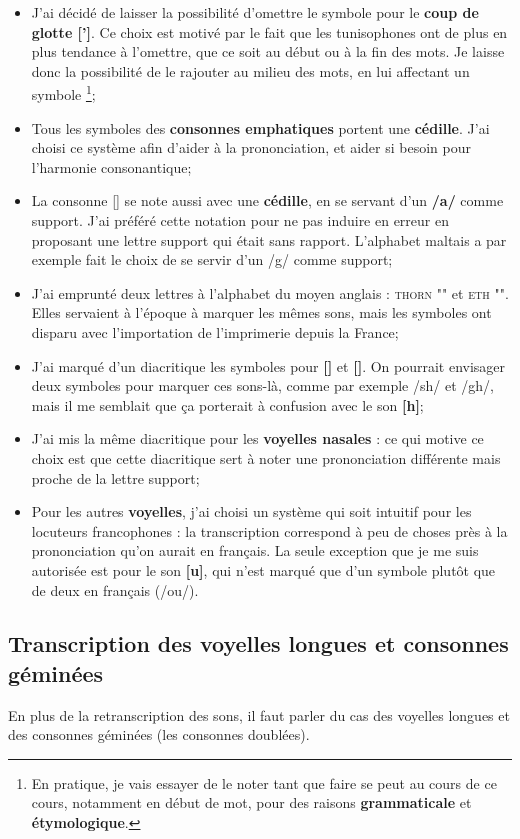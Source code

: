 \begin{itemize}
    \item J'ai décidé de laisser la possibilité d'omettre le symbole pour le \textbf{coup de glotte [']}. Ce choix est motivé par le fait que les tunisophones ont de plus en plus tendance à l'omettre, que ce soit au début ou à la fin des mots. Je laisse donc la possibilité de le rajouter au milieu des mots, en lui affectant un symbole \footnote{En pratique, je vais essayer de le noter tant que faire se peut au cours de ce cours, notamment en début de mot, pour des raisons \textbf{grammaticale} et \textbf{étymologique}.};
    \item Tous les symboles des \textbf{consonnes emphatiques} portent une \textbf{cédille}. J'ai choisi ce système afin d'aider à la prononciation, et aider si besoin pour l'harmonie consonantique;
    \item La consonne [\textrevglotstop] se note aussi avec une \textbf{cédille}, en se servant d'un \textbf{/a/} comme support. J'ai préféré cette notation pour ne pas induire en erreur en proposant une lettre support qui était sans rapport. L'alphabet maltais a par exemple fait le choix de se servir d'un /g/ comme support;
    \item J'ai emprunté deux lettres à l'alphabet du moyen anglais : \textsc{thorn} "\textbf{\th}" et \textsc{eth} "\textbf{\dh}". Elles servaient à l'époque à marquer les mêmes sons, mais les symboles ont disparu avec l'importation de l'imprimerie depuis la France;
    \item J'ai marqué d'un diacritique les symboles pour \textbf{[\textesh]} et \textbf{[\textinvscr]}. On pourrait envisager deux symboles pour marquer ces sons-là, comme par exemple /sh/ et /gh/, mais il me semblait que ça porterait à confusion avec le son \textbf{[h]};
    \item J'ai mis la même diacritique pour les \textbf{voyelles nasales} : ce qui motive ce choix est que cette diacritique sert à noter une prononciation différente mais proche de la lettre support;
    \item Pour les autres \textbf{voyelles}, j'ai choisi un système qui soit intuitif pour les locuteurs francophones : la transcription correspond à peu de choses près à la prononciation qu'on aurait en français. La seule exception que je me suis autorisée est pour le son \textbf{[u]}, qui n'est marqué que d'un symbole plutôt que de deux en français (/ou/).
\end{itemize}

\subsection{Transcription des voyelles longues et consonnes géminées}
En plus de la retranscription des sons, il faut parler du cas des voyelles longues et des consonnes géminées (les consonnes doublées).

